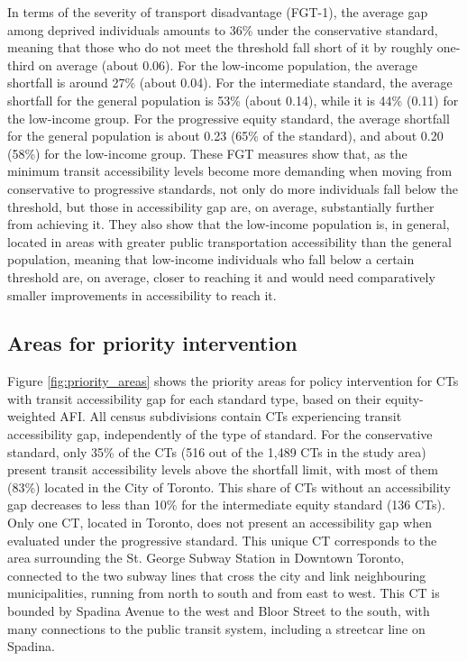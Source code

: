 \documentclass[preprint, 3p,
authoryear]{elsarticle} %
\begin{document}
In terms of the severity of transport disadvantage (FGT-1), the average
gap among deprived individuals amounts to 36\% under the conservative
standard, meaning that those who do not meet the threshold fall short of
it by roughly one-third on average (about 0.06). For the low-income
population, the average shortfall is around 27\% (about 0.04). For the
intermediate standard, the average shortfall for the general population
is 53\% (about 0.14), while it is 44\% (0.11) for the low-income group.
For the progressive equity standard, the average shortfall for the
general population is about 0.23 (65\% of the standard), and about 0.20
(58\%) for the low-income group. These FGT measures show that, as the
minimum transit accessibility levels become more demanding when moving
from conservative to progressive standards, not only do more individuals
fall below the threshold, but those in accessibility gap are, on
average, substantially further from achieving it. They also show that
the low-income population is, in general, located in areas with greater
public transportation accessibility than the general population, meaning
that low-income individuals who fall below a certain threshold are, on
average, closer to reaching it and would need comparatively smaller
improvements in accessibility to reach it.

\subsection{Areas for priority
intervention}\label{areas-for-priority-intervention-1}

Figure \ref{fig:priority_areas} shows the priority areas for policy
intervention for CTs with transit accessibility gap for each standard
type, based on their equity-weighted AFI. All census subdivisions
contain CTs experiencing transit accessibility gap, independently of the
type of standard. For the conservative standard, only 35\% of the CTs
(516 out of the 1,489 CTs in the study area) present transit
accessibility levels above the shortfall limit, with most of them (83\%)
located in the City of Toronto. This share of CTs without an
accessibility gap decreases to less than 10\% for the intermediate
equity standard (136 CTs). Only one CT, located in Toronto, does not
present an accessibility gap when evaluated under the progressive
standard. This unique CT corresponds to the area surrounding the St.
George Subway Station in Downtown Toronto, connected to the two subway
lines that cross the city and link neighbouring municipalities, running
from north to south and from east to west. This CT is bounded by Spadina
Avenue to the west and Bloor Street to the south, with many connections
to the public transit system, including a streetcar line on Spadina.
\end{document}
